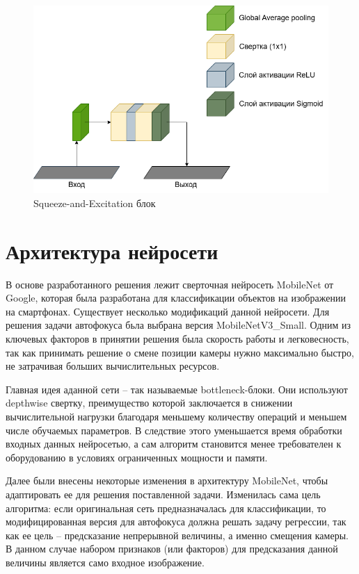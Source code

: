 \begin{figure}[ht] 
	\center
	\includegraphics [scale=0.5] {my_folder/images/FocusNet-SE layer.png}
	\caption{Squeeze-and-Excitation блок}
	\label{fig:SE_block}
\end{figure}

\section{Архитектура нейросети} \label{ch2:architecture}

В основе разработанного решения лежит сверточная нейросеть MobileNet от Google, которая была разработана для классификации объектов на изображении на смартфонах. Существует несколько модификаций данной нейросети. Для решения задачи автофокуса бьла выбрана версия MobileNetV3\_Small. Одним из ключевых факторов в принятии решения была скорость работы и легковесность, так как принимать решение о смене позиции камеры нужно максимально быстро, не затрачивая больших вычислительных ресурсов.

Главная идея аданной сети -- так называемые bottleneck-блоки. Они используют depthwise свертку, преимущество которой заключается в снижении вычислительной нагрузки благодаря меньшему количеству операций и меньшем числе обучаемых параметров. В следствие этого уменьшается время обработки входных данных нейросетью, а сам алгоритм становится менее требователен к оборудованию в условиях ограниченных мощности и памяти.

Далее были внесены некоторые изменения в архитектуру MobileNet, чтобы адаптировать ее для решения поставленной задачи. Изменилась сама цель алгоритма: если оригинальная сеть предназначалась для классификации, то модифицированная версия для автофокуса должна решать задачу регрессии, так как ее цель -- предсказание непрерывной величины, а именно смещения камеры. В данном случае набором признаков (или факторов) для предсказания данной величины является само входное изображение.

